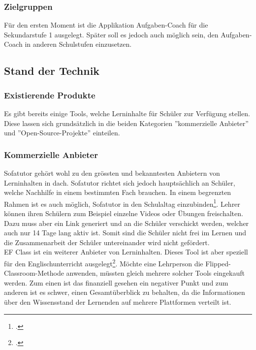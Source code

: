 \subsubsection{Zielgruppen}
Für den ersten Moment ist die Applikation Aufgaben-Coach für die Sekundarstufe 1 ausgelegt. Später soll es jedoch auch möglich sein, den Aufgaben-Coach in anderen Schulstufen einzusetzen.

\subsection{Stand der Technik}
\subsubsection{Existierende Produkte}
Es gibt bereits einige Tools, welche Lerninhalte für Schüler zur Verfügung stellen. Diese lassen sich grundsätzlich in die beiden Kategorien ''kommerzielle Anbieter'' und ''Open-Source-Projekte'' einteilen.

\subsubsection*{Kommerzielle Anbieter}
Sofatutor gehört wohl zu den grössten und bekanntesten Anbietern von Lerninhalten in \gls{dach}. Sofatutor richtet sich jedoch hauptsächlich an Schüler, welche Nachhilfe in einem bestimmten Fach brauchen. In einem begrenzten Rahmen ist es auch möglich, Sofatutor in den Schulaltag einzubinden\footcite{sofatutor_fuer_lehrer}. Lehrer können ihren Schülern zum Beispiel einzelne Videos oder Übungen freischalten. Dazu muss aber ein Link generiert und an die Schüler verschickt werden, welcher auch nur 14 Tage lang aktiv ist. Somit sind die Schüler nicht frei im Lernen und die Zusammenarbeit der Schüler untereinander wird nicht gefördert.\\

EF Class ist ein weiterer Anbieter von Lerninhalten. Dieses Tool ist aber speziell für den Englischunterricht ausgelegt\footcite{ef_class_homepage}. Möchte eine Lehrperson die Flipped-Classroom-Methode anwenden, müssten gleich mehrere solcher Tools eingekauft werden. Zum einen ist das finanziell gesehen ein negativer Punkt und zum anderen ist es schwer, einen Gesamtüberblick zu behalten, da die Informationen über den Wissensstand der Lernenden auf mehrere Plattformen verteilt ist.



